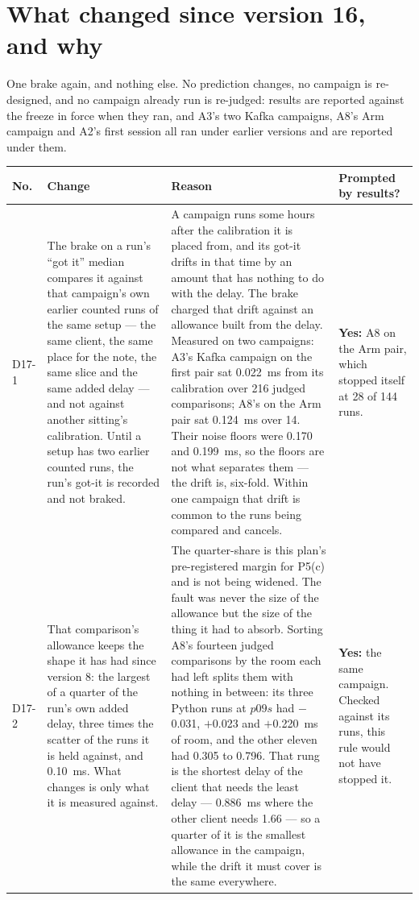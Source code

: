 \documentclass[11pt]{article}
\begin{document}
\section*{What changed since version 16, and why}
One brake again, and nothing else. No prediction changes, no campaign is re-designed, and no
campaign already run is re-judged: results are reported against the freeze in force when they ran,
and A3's two Kafka campaigns, A8's Arm campaign and A2's first session all ran under earlier
versions and are reported under them.

{\small
\begin{longtable}{@{}p{1.1cm} >{\raggedright\arraybackslash}p{6.1cm} >{\raggedright\arraybackslash}p{6.0cm} >{\raggedright\arraybackslash}p{2.2cm}@{}}
\toprule
\textbf{No.} & \textbf{Change} & \textbf{Reason} & \textbf{Prompted by results?} \\
\midrule
\endhead
D17-1 & The brake on a run's ``got it'' median compares it against that campaign's own earlier counted runs of the same setup --- the same client, the same place for the note, the same slice and the same added delay --- and not against another sitting's calibration. Until a setup has two earlier counted runs, the run's got-it is recorded and not braked. & A campaign runs some hours after the calibration it is placed from, and its got-it drifts in that time by an amount that has nothing to do with the delay. The brake charged that drift against an allowance built from the delay. Measured on two campaigns: A3's Kafka campaign on the first pair sat 0.022~ms from its calibration over 216 judged comparisons; A8's on the Arm pair sat 0.124~ms over 14. Their noise floors were 0.170 and 0.199~ms, so the floors are not what separates them --- the drift is, six-fold. Within one campaign that drift is common to the runs being compared and cancels. & \textbf{Yes:} A8 on the Arm pair, which stopped itself at 28 of 144 runs. \\
D17-2 & That comparison's allowance keeps the shape it has had since version 8: the largest of a quarter of the run's own added delay, three times the scatter of the runs it is held against, and 0.10~ms. What changes is only what it is measured against. & The quarter-share is this plan's pre-registered margin for P5(c) and is not being widened. The fault was never the size of the allowance but the size of the thing it had to absorb. Sorting A8's fourteen judged comparisons by the room each had left splits them with nothing in between: its three Python runs at $p09s$ had $-$0.031, $+$0.023 and $+$0.220~ms of room, and the other eleven had 0.305 to 0.796. That rung is the shortest delay of the client that needs the least delay --- 0.886~ms where the other client needs 1.66 --- so a quarter of it is the smallest allowance in the campaign, while the drift it must cover is the same everywhere. & \textbf{Yes:} the same campaign. Checked against its runs, this rule would not have stopped it. \\

\end{longtable}}
\end{document}
